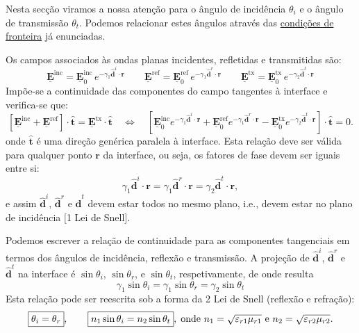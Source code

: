 Nesta secção viramos a nossa atenção para o ângulo de incidência $\theta_i$ e o ângulo de transmissão $\theta_t$. Podemos relacionar estes ângulos através das \hyperref[sec:boundary-conditions-waves]{condições de fronteira} já enunciadas.

Os campos associados às ondas planas incidentes, refletidas e transmitidas são:
\begin{equation}
    \mathbf{\underline{E}}^{\text{inc}} = \mathbf{\underline{E}}^{\text{inc}}_{0}\, e^{-\gamma_1 \mathbf{\hat{d}}^i \cdot \mathbf{r}}
    \qquad
    \mathbf{\underline{E}}^{\text{ref}} = \mathbf{\underline{E}}^{\text{ref}}_{0}\, e^{-\gamma_1 \mathbf{\hat{d}}^r \cdot \mathbf{r}}
    \qquad
    \mathbf{\underline{E}}^{\text{tx}} = \mathbf{\underline{E}}^{\text{tx}}_{0}\, e^{-\gamma_2 \mathbf{\hat{d}}^t \cdot \mathbf{r}}
\end{equation}
Impõe-se a continuidade das componentes do campo tangentes à interface e verifica-se que:
\begin{equation}
    \left[ \mathbf{\underline{E}}^{\text{inc}} + \mathbf{\underline{E}}^{\text{ref}} \right] \cdot \mathbf{\hat{t}} = \mathbf{\underline{E}}^{\text{tx}} \cdot \mathbf{\hat{t}}
    \quad\iff\quad
    \left[ \mathbf{\underline{E}}_{0}^{\text{inc}} e^{-\gamma_1 \mathbf{\hat{d}}^i \cdot \mathbf{r}} + \mathbf{\underline{E}}_{0}^{\text{ref}} e^{-\gamma_1 \mathbf{\hat{d}}^r \cdot \mathbf{r}} - \mathbf{\underline{E}}_{0}^{\text{tx}} e^{-\gamma_2 \mathbf{\hat{d}}^t \cdot \mathbf{r}} \right] \cdot \mathbf{\hat{t}} = 0.
\end{equation}
onde $\mathbf{\hat{t}}$ é uma direção genérica paralela à interface. Esta relação deve ser válida para qualquer ponto $\mathbf{r}$ da interface, ou seja, os fatores de fase devem ser iguais entre si:
\begin{equation}
    \gamma_1 \mathbf{\hat{d}}^i \cdot \mathbf{r} = \gamma_1 \mathbf{\hat{d}}^r \cdot \mathbf{r} = \gamma_2 \mathbf{\hat{d}}^t \cdot \mathbf{r},
\end{equation}
e assim $\mathbf{\hat{d}}^i$, $\mathbf{\hat{d}}^r$ e $\mathbf{\hat{d}}^t$ devem estar todos no mesmo plano, i.e., devem estar no plano de incidência $[$1\textordfeminine{} Lei de Snell$]$.

Podemos escrever a relação de continuidade para as componentes tangenciais em termos dos ângulos de incidência, reflexão e transmissão. A projeção de $\mathbf{\hat{d}}^i$, $\mathbf{\hat{d}}^r$ e $\mathbf{\hat{d}}^t$ na interface é $\sin \theta_i$, $\sin \theta_r$, e $\sin \theta_t$, respetivamente, de onde resulta
\begin{equation}
    \gamma_1 \sin \theta_i = \gamma_1 \sin \theta_r = \gamma_2 \sin \theta_t
\end{equation}
Esta relação pode ser reescrita sob a forma da 2\textordfeminine{} Lei de Snell (reflexão e refração):
\begin{equation}
    \boxed{%
        \theta_i = \theta_r
    },
    \qquad
    \boxed{%
        n_1 \sin \theta_i = n_2 \sin \theta_t
    },
    \; \text{onde $n_1 = \sqrt{\epsilon_{r1} \mu_{r1}}$ e $n_2 = \sqrt{\epsilon_{r2} \mu_{r2}}$}.
\end{equation}

